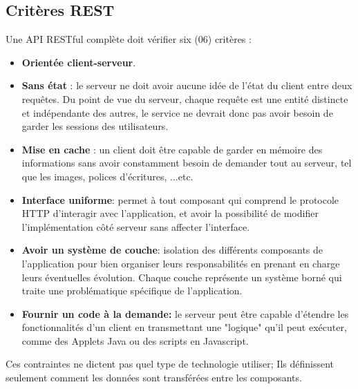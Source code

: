 \subsection{Critères REST}
Une API RESTful complète doit vérifier six (06) critères :
\begin{itemize}
	\item \textbf{Orientée client-serveur}.
	      
	\item \textbf{Sans état} : le serveur ne doit avoir aucune idée de l'état du client entre deux requêtes. Du point de vue du serveur, chaque requête est une entité distincte et indépendante des autres, le service ne devrait donc pas avoir besoin de garder les sessions des utilisateurs.
	      
	\item \textbf{Mise en cache} : un client doit être capable de garder en mémoire des informations sans avoir constamment besoin de demander tout au serveur, tel que les images, polices d'écritures, ...etc.
	      
	\item \textbf{Interface uniforme}: permet à tout composant qui comprend le protocole HTTP d'interagir avec l'application, et avoir la possibilité de modifier l'implémentation côté serveur sans affecter l'interface.
	      
	\item \textbf{Avoir un système de couche}: isolation des différents composants de l'application pour bien organiser leurs responsabilités en prenant en charge leurs éventuelles évolution. Chaque couche représente un système borné qui traite une problématique spécifique de l'application.
	      
	\item \textbf{Fournir un code à la demande: } le serveur peut être capable d'étendre les fonctionnalités d'un client en transmettant une "logique" qu'il peut exécuter, comme des Applets Java ou des scripts en Javascript.
	      
\end{itemize}
Ces contraintes ne dictent pas quel type de technologie utiliser; Ils définissent seulement comment les données sont transférées entre les composants.

